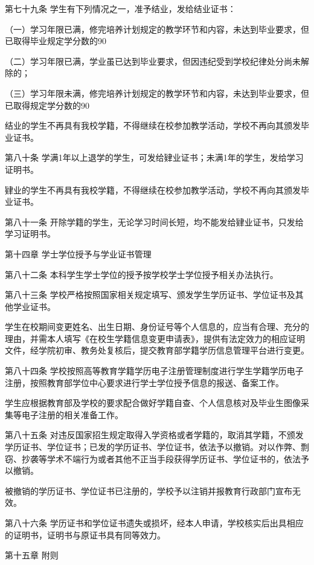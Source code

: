 \documentclass[UTF8,12pt,a4paper]{report}
\begin{document}
第七十九条  学生有下列情况之一，准予结业，发给结业证书：

（一）学习年限已满，修完培养计划规定的教学环节和内容，未达到毕业要求，但已取得毕业规定学分数的90%

（二）学习年限已满，学业虽已达到毕业要求，但因违纪受到学校纪律处分尚未解除的；

（三）学习年限未满，修完培养计划规定的教学环节和内容，未达到毕业要求，但已取得规定学分数的90%

结业的学生不再具有我校学籍，不得继续在校参加教学活动，学校不再向其颁发毕业证书。

第八十条  学满1年以上退学的学生，可发给肄业证书；未满1年的学生，发给学习证明书。

肄业的学生不再具有我校学籍，不得继续在校参加教学活动，学校不再向其颁发毕业证书。

第八十一条  开除学籍的学生，无论学习时间长短，均不能发给肄业证书，只发给学习证明书。



第十四章  学士学位授予与学业证书管理

第八十二条  本科学生学士学位的授予按学校学士学位授予相关办法执行。

第八十三条  学校严格按照国家相关规定填写、颁发学生学历证书、学位证书及其他学业证书。

学生在校期间变更姓名、出生日期、身份证号等个人信息的，应当有合理、充分的理由，并需本人填写《在校生学籍信息变更申请表》，提供有法定效力的相应证明文件，经学院初审、教务处复核后，提交教育部学籍学历信息管理平台进行变更。

第八十四条  学校按照高等教育学籍学历电子注册管理制度进行学生学籍学历电子注册，按照教育部学位中心要求进行学士学位授予信息的报送、备案工作。

学生应根据教育部及学校的要求配合做好学籍自查、个人信息核对及毕业生图像采集等电子注册的相关准备工作。

第八十五条  对违反国家招生规定取得入学资格或者学籍的，取消其学籍，不颁发学历证书、学位证书；已发的学历证书、学位证书，依法予以撤销。对以作弊、剽窃、抄袭等学术不端行为或者其他不正当手段获得学历证书、学位证书的，依法予以撤销。

被撤销的学历证书、学位证书已注册的，学校予以注销并报教育行政部门宣布无效。

第八十六条  学历证书和学位证书遗失或损坏，经本人申请，学校核实后出具相应的证明书，证明书与原证书具有同等效力。



第十五章  附则
\end{document}
